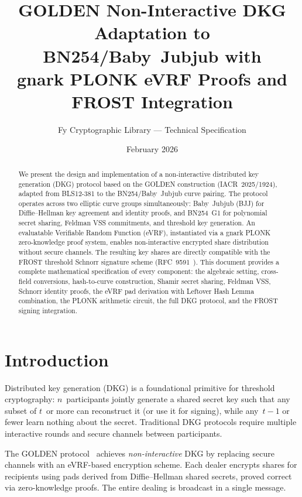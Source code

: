 \documentclass[11pt,a4paper]{article}
\title{%
  \textbf{GOLDEN Non-Interactive DKG}\\[0.3em]
  \large Adaptation to BN254/Baby~Jubjub with\\
  gnark PLONK eVRF Proofs and FROST Integration
}
\author{Fy Cryptographic Library --- Technical Specification}
\date{February 2026}
\begin{document}
\maketitle

\begin{abstract}
We present the design and implementation of a non-interactive distributed key
generation (DKG) protocol based on the GOLDEN construction (IACR~2025/1924),
adapted from BLS12-381 to the BN254/Baby~Jubjub curve pairing. The protocol
operates across two elliptic curve groups simultaneously: Baby~Jubjub
(BJJ) for Diffie--Hellman key agreement and identity proofs, and BN254~G1 for
polynomial secret sharing, Feldman VSS commitments, and threshold key
generation. An evaluatable Verifiable Random Function (eVRF), instantiated
via a gnark PLONK zero-knowledge proof system, enables non-interactive
encrypted share distribution without secure channels. The resulting key shares
are directly compatible with the FROST threshold Schnorr signature scheme
(RFC~9591~\cite{rfc9591}). This document provides a complete mathematical specification of
every component: the algebraic setting, cross-field conversions, hash-to-curve
construction, Shamir secret sharing, Feldman VSS, Schnorr identity proofs, the
eVRF pad derivation with Leftover Hash Lemma combination, the PLONK arithmetic
circuit, the full DKG protocol, and the FROST signing integration.
\end{abstract}

\tableofcontents
\newpage

\section{Introduction}
\label{sec:intro}

Distributed key generation (DKG) is a foundational primitive for threshold
cryptography: $n$~participants jointly generate a shared secret key such that
any subset of $t$~or more can reconstruct it (or use it for signing), while
any~$t-1$ or fewer learn nothing about the secret. Traditional DKG protocols
require multiple interactive rounds and secure channels between participants.

The GOLDEN protocol~\cite{golden2025} achieves \emph{non-interactive} DKG by
replacing secure channels with an eVRF-based encryption scheme. Each dealer
encrypts shares for recipients using pads derived from Diffie--Hellman shared
secrets, proved correct via zero-knowledge proofs. The entire dealing is
broadcast in a single message.
\end{document}
